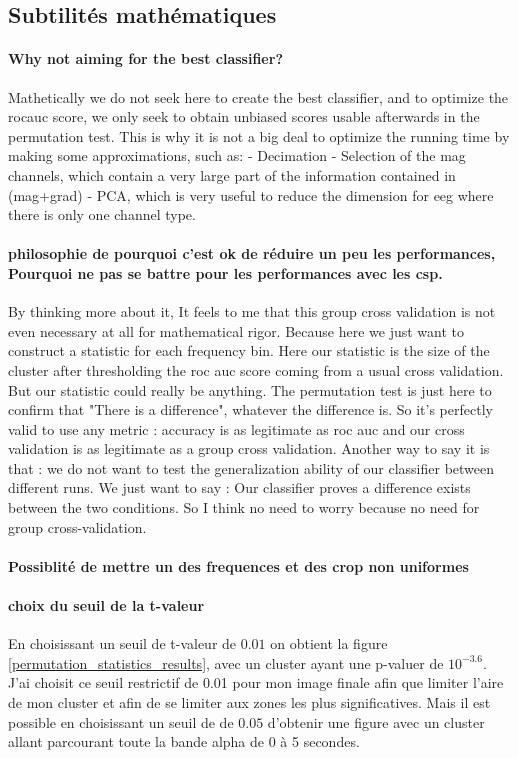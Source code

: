 \subsection{Subtilités mathématiques}

\paragraph{Why not aiming for the best classifier?}
Mathetically we do not seek here to create the best classifier,
and to optimize the rocauc score, we only seek
to obtain unbiased scores usable afterwards in the permutation test.
This is why it is not a big deal to optimize the running time
by making some approximations, such as:
- Decimation
- Selection of the mag channels, which contain a very large part of
the information contained in (mag+grad)
- PCA, which is very useful to reduce the dimension for eeg
where there is only one channel type.


\paragraph{philosophie de pourquoi c'est ok de réduire un peu les performances, Pourquoi ne pas se battre pour les performances avec les csp.}

By thinking more about it, It feels to me that this group cross validation is not even necessary at all for mathematical rigor. Because here we just want to construct a statistic for each frequency bin. Here our statistic is the size of the cluster after thresholding the roc auc score coming from a usual cross validation. But our statistic could really be anything. The permutation test is just here to confirm that "There is a difference", whatever the difference is. So it's perfectly valid to use any metric : accuracy is as legitimate as roc auc and our cross validation is as legitimate as a group cross validation.
Another way to say it is that : we do not want to test the generalization ability of our classifier between different runs. We just want to say : Our classifier proves a difference exists between the two conditions.
So I think no need to worry because no need for group cross-validation.


\paragraph{Possiblité de mettre un des frequences et des crop non uniformes}

\paragraph{choix du seuil de la t-valeur}
En choisissant un seuil de t-valeur de $0.01$ on obtient la figure \ref{permutation_statistics_results}, avec un cluster ayant une p-valuer de $10^{-3.6}$. J'ai choisit ce seuil restrictif de 0.01 pour mon image finale afin que limiter l'aire de mon cluster et afin de se limiter aux zones les plus significatives. Mais il est possible en choisissant un seuil de de $0.05$ d'obtenir une figure avec un cluster allant parcourant toute la bande alpha de 0 à 5 secondes.

